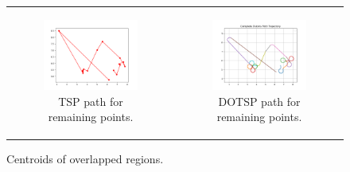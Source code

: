\begin{figure}[H]
    \centering
    \begin{tabular}{cc} 
        \begin{subfigure}{0.5\textwidth}
            \centering
            \includegraphics[width=\textwidth]{Images/Algorithm_no_obs/OTSP.png}
            \caption{TSP path for remaining points.}
        \end{subfigure} 
        &
        \begin{subfigure}{0.5\textwidth}
            \centering
            \includegraphics[width=\textwidth]{Images/Algorithm_no_obs/tsp_dubins_path.png}
            \caption{DOTSP path for remaining points.}
        \end{subfigure}
    \end{tabular}
    \caption{Centroids of overlapped regions.\label{fig:dotsp_path}} 
\end{figure}

